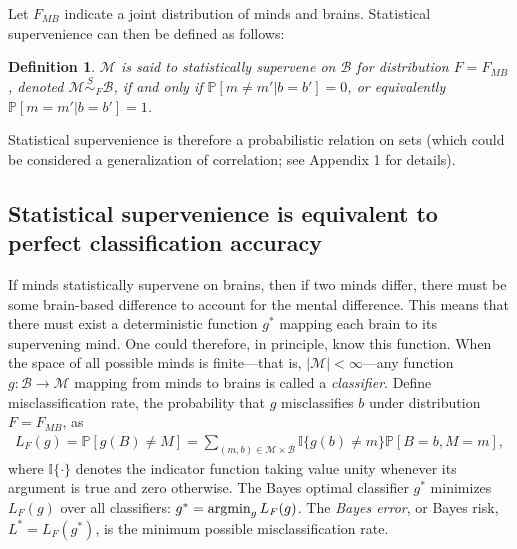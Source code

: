 \documentclass{article}
\newcommand{\mB}{\mathcal{B}}
\newcommand{\mM}{\mathcal{M}}
\newcommand{\PP}{\mathbb{P}}           %
\newcommand{\II}{\mathbb{I}}           %
\providecommand{\mc}[1]{\mathcal{#1}}
\providecommand{\mh}[1]{\widehat{#1}}
\newcommand{\argmin}{\operatornamewithlimits{argmin}}
\newcommand{\MsB}{\mM \overset{S}{\sim}_{F} \mB}
\newcommand{\from}{\colon}
\newtheorem{defi}{Definition}
\begin{document}
Let $F_{MB}$ indicate a joint distribution of minds and brains. Statistical supervenience can then be defined as follows:
\begin{defi}
\label{def:1} 
$\mM$ is said to \textit{statistically supervene} on $\mB$ for distribution $F=F_{MB}$, denoted $\mM \overset{S}{\sim}_F \mB$, if and only if $\PP[m \neq m' | b=b']=0$, or equivalently $\PP[m = m' | b = b']=1$. 
\end{defi}
\noindent Statistical supervenience is therefore a probabilistic relation on sets (which could be considered a generalization of correlation; see Appendix 1 for details).  



\subsection*{Statistical supervenience is equivalent to perfect classification accuracy} %
\label{sub:theoretical_results}

If minds statistically supervene on brains, 
then if two minds differ, there must be some brain-based difference to account for the mental difference.  This means that there must exist a deterministic function $g^*$ mapping each brain to its supervening mind. One could therefore, in principle, know this function. When the space of all possible minds is finite---that is, $|\mM| < \infty$---any function $g\from \mB \to \mM$ mapping from minds to brains is called a \emph{classifier}.  
Define misclassification rate, the probability that $g$ misclassifies $b$ under distribution $F=F_{MB}$,  as
\begin{align} \label{eq:1}
L_{F}(g) = \PP[g(B) \neq M] =  \sum_{(m,b) \in \mc{M} \times \mc{B}} \II\{g(b) \neq m\} \PP[B=b, M=m],	
\end{align}
where $\II\{\cdot\}$ denotes the indicator function taking value unity whenever its argument is true and zero otherwise.  The Bayes optimal classifier $g^*$ minimizes $L_{F}(g)$ over all classifiers:	
$g^* = \argmin_{g} L_{F}(g)$.
The \emph{Bayes error}, or Bayes risk, $L^*=L_{F}(g^*)$, is the minimum possible misclassification rate.
\end{document}
